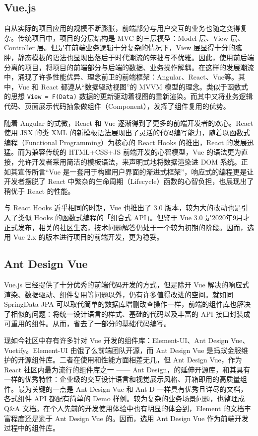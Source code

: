 \subsection{Vue.js}
自从实际的项目应用的规模不断膨胀，前端部分与用户交互的业务也随之变得复杂。传统项目中，项目的分层结构是 MVC 的三层模型：Model 层、View 层、Controller 层。但是在前端业务逻辑十分复杂的情况下，View 层显得十分的臃肿，静态模板的语法也显现出落后于时代潮流的笨拙与不优雅。因此，使用前后端分离的项目，将项目的前端部分与后端的数据、业务操作解耦。在这样的发展潮流中，涌现了许多性能优异、理念前卫的前端框架：Angular、React、Vue等。其中，Vue 和 React 都遵从“数据驱动视图”的 MVVM 模型的理念。类似于函数式的思想 \lstinline!View = F(Data)! 数据的更新驱动着视图的重新渲染。而其中又将业务逻辑代码、页面展示代码抽象做组件（Component），发挥了组件复用的优势。

随着 Angular 的式微，React 和 Vue 逐渐得到了更多的前端开发者的欢心。React 使用 JSX 的类 XML 的新模板语法展现出了灵活的代码编写能力，随着以函数式编程（Functional Programming）为核心的 React Hooks 的推出，React 的发展迅猛。而为兼容传统的 HTML+CSS+JS 前端开发的心智模型，Vue 的语法更为直接，允许开发者采用简洁的模板语法，来声明式地将数据渲染进 DOM 系统。正如其宣传所言“Vue 是一套用于构建用户界面的渐进式框架”，响应式的编程更是让开发者摆脱了 React 中繁杂的生命周期（Lifecycle）函数的心智负担，也展现出了稍优于 React 的性能。

与 React Hooks 近乎相同的时期，Vue 也推出了 3.0 版本，较为大的改动也是引入了类似 Hooks 的函数式编程的「组合式 API」。但鉴于 Vue 3.0 是2020年9月才正式发布，相关的社区生态，技术问题解答仍处于一个较为初期的阶段。因而，选用 Vue 2.x 的版本进行项目的前端开发，更为稳妥。

\subsection{Ant Design Vue}
Vue.js 已经提供了十分优秀的前端代码开发的方式，但是除开 Vue 解决的响应式渲染、数据驱动、组件复用等问题以外，仍有许多值得改进的空间。就如同 SpringData JPA 可以取代简单的数据库增删改查操作一样，前端的组件库也解决了相似的问题：将统一设计语言的样式、基础的代码以及丰富的 API 接口封装成可重用的组件。从而，省去了一部分的基础代码编写。

现如今社区中存有许多针对 Vue 开发的组件库：Element-UI、Ant Design Vue、Vuetify。Element-UI 由饿了么前端团队开源，而 Ant Design Vue 是蚂蚁金服维护的开源组件库。二者在使用和性能方面相差无几，但 Ant Design Vue，作为React 社区内最为流行的组件库之一 —— Ant Design，的延伸开源库，和其具有一样的优秀特性：企业级的交互设计语言和视觉展示风格、开箱即用的高质量组件。最为关键的一点是 Ant Design Vue 和 Ant-D 一样具有优秀且详尽的文档，各式组件 API 都配有简单的 Demo 样例。较为复杂的业务场景问题，也整理成 Q\&A 文档。在个人先前的开发使用体验中也有明显的体会到，Element 的文档丰富程度还是逊于 Ant Design Vue 的。因而，选用 Ant Design Vue 作为前端开发过程中的组件库。

